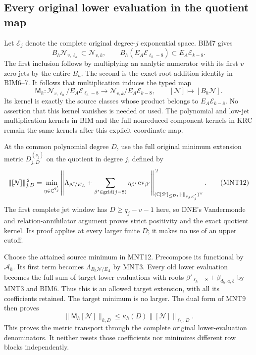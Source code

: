 \documentclass[11pt,a4paper]{article}
\begin{document}
\subsection{Every original lower evaluation in the quotient map}

Let $\mathscr E_j$ denote the complete original
degree-$j$ exponential space. BIM7 gives
\[
 B_h\mathscr N_{v,\ell_h}\subset\mathscr N_{v,k},\qquad
 B_h(E_A\mathscr E_{\ell_h-8})
                       \subset E_A\mathscr E_{k-8}.
 \tag{MNT10}
\]
The first inclusion follows by multiplying an analytic
numerator with its first $v$ zero jets by the entire $B_h$.
The second is the exact root-addition identity in BIM6--7.
It follows that multiplication induces the typed map
\[
 \mathsf M_h:
   \mathscr N_{v,\ell_h}/E_A\mathscr E_{\ell_h-8}
      \longrightarrow
   \mathscr N_{v,k}/E_A\mathscr E_{k-8},\qquad
 [\mathcal N]\longmapsto[B_h\mathcal N].
 \tag{MNT11}
\]
Its kernel is exactly the source classes whose product
belongs to $E_A\mathscr E_{k-8}$. No assertion that this
kernel vanishes is needed or used.
The polynomial and low-jet multiplication kernels in BIM
and the full nonreduced component kernels in KRC remain
the same kernels after this explicit coordinate map.

At the common polynomial degree $D$, use the full original
minimum extension metric $D_{j,D}^{(s_j)}$ on the quotient
in degree $j$, defined by
\[
 \|[\mathcal N]\|_{j,D}^{\,2}
   =\min_{\eta\in\mathbb C^{q'_j}}
       \left\|\Lambda_{\mathcal N/E_A}
                    +\sum_{\beta'\in{\rm grid}(j-8)}
                          \eta_{\beta'}\operatorname{ev}_{\beta'}
       \right\|_{(\mathbb C[S']_{\le D},
                             \|\cdot\|_{s_j,c'_j})^\vee}^{\,2}.
 \tag{MNT12}
\]
The first complete jet window has $D\ge q_j-v-1$ here,
so DNE's Vandermonde and relation-annihilator argument
proves strict positivity and the exact quotient kernel.
Its proof applies at every larger finite $D$; it makes
no use of an upper cutoff.

Choose the attained source minimum in MNT12.
Precompose its functional by $\mathcal A_h$.
Its first term becomes $\Lambda_{B_h\mathcal N/E_A}$
by MNT3. Every old lower evaluation becomes the full
sum of target lower evaluations with roots
$\beta'_{\ell_h-8}+\beta_{d_h,a,b}$ by MNT3 and BIM6.
Thus this is an allowed target extension, with all its
coefficients retained. The target minimum is no larger.
The dual form of MNT9 then proves
\[
 \|\mathsf M_h[\mathcal N]\|_{k,D}
       \le\kappa_h(D)\|[\mathcal N]\|_{\ell_h,D}.
 \tag{MNT13}
\]
This proves the metric transport through the complete
original lower-evaluation denominators.
It neither resets those coefficients nor minimizes
different row blocks independently.
\end{document}
